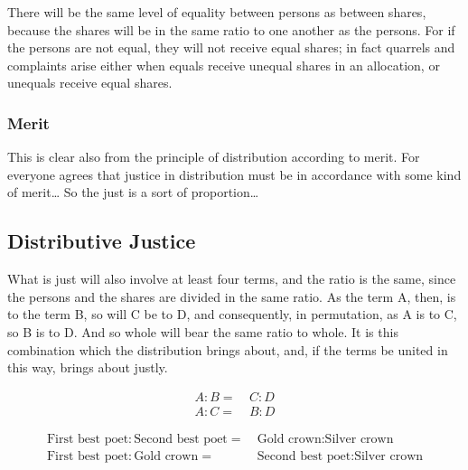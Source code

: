                 \begin{remark}
                    There will be the same level of equality between persons as between shares, because the shares will be in the same ratio to one another as the persons. For if the persons are not equal, they will not receive equal shares; in fact quarrels and complaints arise either when equals receive unequal shares in an allocation, or unequals receive equal shares.
                \end{remark}

                \subsubsection{Merit}

                    This is clear also from the principle of distribution according to merit. For everyone agrees that justice in distribution must be in accordance with some kind of merit… So the just is a sort of proportion…

            \subsection{Distributive Justice}

                 What is just will also involve at least four terms, and the ratio is the same, since the persons and the shares are divided in the same ratio. As the term A, then, is to the term B, so will C be to D, and consequently, in permutation, as A is to C, so B is to D. And so whole will bear the same ratio to whole. It is this combination which the distribution brings about, and, if the terms be united in this way, brings about justly.

                    \begin{align}
                        A:B = & \ C:D \\
                        A:C = & \ B:D
                    \end{align}

                    \begin{example}
                        \begin{align}
                            \text{First best poet} : \text{Second best poet} = & \ \text{Gold crown} : \text{Silver crown} \\
                            \text{First best poet} :\text{Gold crown}  = & \ \text{Second best poet} : \text{Silver crown}
                        \end{align}
                    \end{example}

